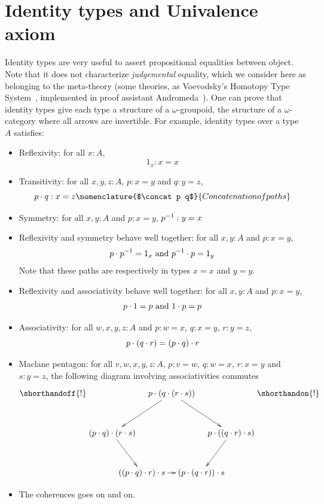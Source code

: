 \section{Identity types and Univalence axiom}
\label{sec:ua}

Identity types are very useful to assert propositional equalities
between object. Note that it does not characterize {\em judgemental}
equality, which we consider here as belonging to the meta-theory (some
theories, as Voevodsky's Homotopy Type System~\cite{hts}, implemented
in proof assistant Andromeda~\cite{andromeda}). 
One can prove that identity types give each type a structure of a
$\omega$-groupoid, \ie{} the structure of a $\omega$-category where
all arrows are invertible. For example, identity types over a type $A$
satisfies:

\begin{itemize}
\item Reflexivity: for all $x:A$, \[1_x:x=x\]
\item Transitivity: for all $x,y,z:A$, $p:x=y$ and $q:y= z$, \[\concat p
 q: x = z\nomenclature{$\concat p q$}{Concatenation of paths}\]
\item Symmetry: for all $x,y:A$ and $p:x=y$, $p^{-1}:
  y=x$
\item Reflexivity and symmetry behave well together: for all $x,y:A$
  and $p:x=y$, \[p\cdot p^{-1} = 1_x\text{ and } p^{-1}\cdot p = 1_y\]
  Note that these paths are respectively in types $x=x$ and $y=y$.
\item Reflexivity and associativity behave well together: for all
  $x,y:A$ and $p:x=y$, 
  \[p\cdot 1 = p \text{ and } 1\cdot p = p\]
\item Associativity: for all $w,x,y,z:A$ and $p:w=x$, $q:x=y$,
  $r:y=z$,
  \[p\cdot (q\cdot r) = (p\cdot q)\cdot r\]
\item Maclane pentagon: for all $v,w,x,y,z:A$, $p:v=w$, $q:w=x$, $r:x=y$ and
  $s:y=z$, the following diagram involving associativities commutes
\[
  \shorthandoff{!}
  \xymatrix @!0 @R=4pc @C=3pc {
    && \concat p {(\concat q {(\concat r s)})} \ar[dll] \ar[drr]&& \\
    \concat {(\concat p q)} {(\concat r s)}\ar[dr] &&&& \concat p {(\concat
      {(\concat q r)} s)}\ar[ld] \\
    & \concat {(\concat {(\concat p q)} r)} \ar[rr] s && \concat {(\concat p
      {(\concat q r)})} s &
  }
  \shorthandon{!}
\]
\item The coherences goes on and on.
\end{itemize}

